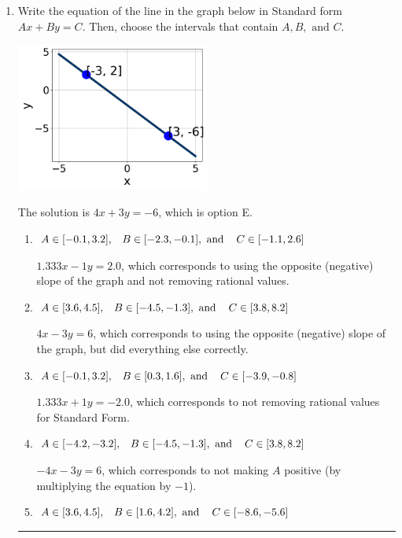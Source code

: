 \documentclass{extbook}[14pt]
\newcommand{\litem}[1]{\item #1

\rule{\textwidth}{0.4pt}}
\begin{document}
\begin{enumerate}\litem{
Write the equation of the line in the graph below in Standard form $Ax+By=C$. Then, choose the intervals that contain $A, B, \text{ and } C$.

\begin{center}
    \includegraphics[width=0.5\textwidth]{../Figures/linearGraphToStandardA.png}
\end{center}


The solution is \( 4x + 3y = -6 \), which is option E.\begin{enumerate}[label=\Alph*.]
\item \( A \in [-0.1, 3.2], \hspace{3mm} B \in [-2.3, -0.1], \text{ and } \hspace{3mm} C \in [-1.1, 2.6] \)

 $1.333x - 1y = 2.0$, which corresponds to using the opposite (negative) slope of the graph and not removing rational values.
\item \( A \in [3.6, 4.5], \hspace{3mm} B \in [-4.5, -1.3], \text{ and } \hspace{3mm} C \in [3.8, 8.2] \)

 $4x - 3y = 6$, which corresponds to using the opposite (negative) slope of the graph, but did everything else correctly.
\item \( A \in [-0.1, 3.2], \hspace{3mm} B \in [0.3, 1.6], \text{ and } \hspace{3mm} C \in [-3.9, -0.8] \)

 $1.333x + 1y = -2.0$, which corresponds to not removing rational values for Standard Form.
\item \( A \in [-4.2, -3.2], \hspace{3mm} B \in [-4.5, -1.3], \text{ and } \hspace{3mm} C \in [3.8, 8.2] \)

 $-4x - 3y = 6$, which corresponds to not making $A$ positive (by multiplying the equation by $-1$).
\item \( A \in [3.6, 4.5], \hspace{3mm} B \in [1.6, 4.2], \text{ and } \hspace{3mm} C \in [-8.6, -5.6] \)


\end{enumerate}}
\end{enumerate}
\end{document}
